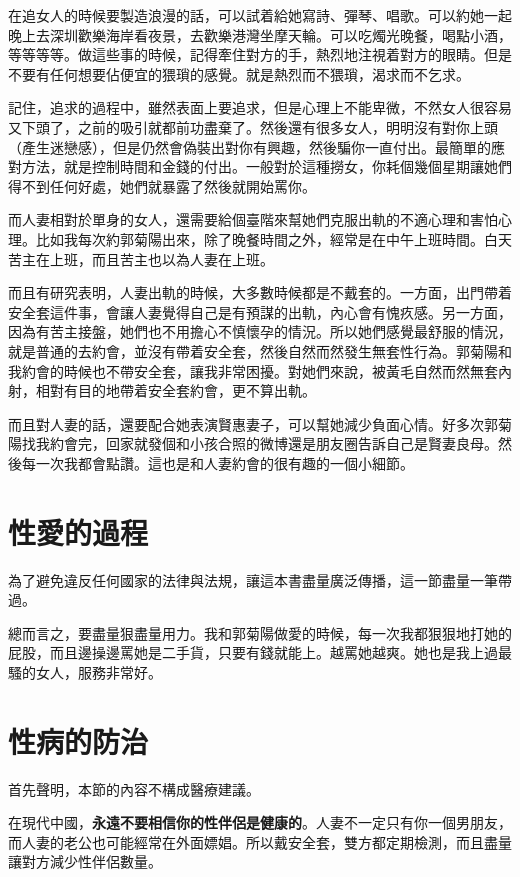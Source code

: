 在追女人的時候要製造浪漫的話，可以試着給她寫詩、彈琴、唱歌。可以約她一起晚上去深圳歡樂海岸看夜景，去歡樂港灣坐摩天輪。可以吃燭光晚餐，喝點小酒，等等等等。做這些事的時候，記得牽住對方的手，熱烈地注視着對方的眼睛。但是不要有任何想要佔便宜的猥瑣的感覺。就是熱烈而不猥瑣，渴求而不乞求。

記住，追求的過程中，雖然表面上要追求，但是心理上不能卑微，不然女人很容易又下頭了，之前的吸引就都前功盡棄了。然後還有很多女人，明明沒有對你上頭（產生迷戀感），但是仍然會偽裝出對你有興趣，然後騙你一直付出。最簡單的應對方法，就是控制時間和金錢的付出。一般對於這種撈女，你耗個幾個星期讓她們得不到任何好處，她們就暴露了然後就開始罵你。

而人妻相對於單身的女人，還需要給個臺階來幫她們克服出軌的不適心理和害怕心理。比如我每次約郭菊陽出來，除了晚餐時間之外，經常是在中午上班時間。白天苦主在上班，而且苦主也以為人妻在上班。

而且有研究表明，人妻出軌的時候，大多數時候都是不戴套的。一方面，出門帶着安全套這件事，會讓人妻覺得自己是有預謀的出軌，內心會有愧疚感。另一方面，因為有苦主接盤，她們也不用擔心不慎懷孕的情況。所以她們感覺最舒服的情況，就是普通的去約會，並沒有帶着安全套，然後自然而然發生無套性行為。郭菊陽和我約會的時候也不帶安全套，讓我非常困擾。對她們來說，被黃毛自然而然無套內射，相對有目的地帶着安全套約會，更不算出軌。

而且對人妻的話，還要配合她表演賢惠妻子，可以幫她減少負面心情。好多次郭菊陽找我約會完，回家就發個和小孩合照的微博還是朋友圈告訴自己是賢妻良母。然後每一次我都會點讚。這也是和人妻約會的很有趣的一個小細節。

\section{性愛的過程}

為了避免違反任何國家的法律與法規，讓這本書盡量廣泛傳播，這一節盡量一筆帶過。

總而言之，要盡量狠盡量用力。我和郭菊陽做愛的時候，每一次我都狠狠地打她的屁股，而且邊操邊罵她是二手貨，只要有錢就能上。越罵她越爽。她也是我上過最騷的女人，服務非常好。

\section{性病的防治}

首先聲明，本節的內容不構成醫療建議。

在現代中國，\textbf{永遠不要相信你的性伴侶是健康的}。人妻不一定只有你一個男朋友，而人妻的老公也可能經常在外面嫖娼。所以戴安全套，雙方都定期檢測，而且盡量讓對方減少性伴侶數量。


